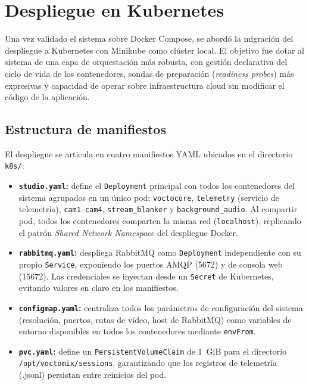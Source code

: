 \section{Despliegue en Kubernetes}
\label{sec:kubernetes}

Una vez validado el sistema sobre Docker Compose, se abordó la migración del despliegue
a Kubernetes con Minikube como clúster local. El objetivo fue dotar al sistema de una
capa de orquestación más robusta, con gestión declarativa del ciclo de vida de los
contenedores, sondas de preparación (\textit{readiness probes}) más expresivas y
capacidad de operar sobre infraestructura cloud sin modificar el código de la aplicación.

\subsection{Estructura de manifiestos}

El despliegue se articula en cuatro manifiestos YAML ubicados en el directorio
\texttt{k8s/}:

\begin{itemize}
  \item \textbf{\texttt{studio.yaml}:} define el \texttt{Deployment} principal con todos
        los contenedores del sistema agrupados en un único pod: \texttt{voctocore},
        \texttt{telemetry} (servicio de telemetría), \texttt{cam1}--\texttt{cam4},
        \texttt{stream\_blanker} y \texttt{background\_audio}. Al compartir pod, todos
        los contenedores comparten la misma red (\texttt{localhost}), replicando el
        patrón \textit{Shared Network Namespace} del despliegue Docker.
  \item \textbf{\texttt{rabbitmq.yaml}:} despliega RabbitMQ como \texttt{Deployment}
        independiente con su propio \texttt{Service}, exponiendo los puertos AMQP (5672)
        y de consola web (15672). Las credenciales se inyectan desde un
        \texttt{Secret} de Kubernetes, evitando valores en claro en los manifiestos.
  \item \textbf{\texttt{configmap.yaml}:} centraliza todos los parámetros de
        configuración del sistema (resolución, puertos, rutas de vídeo, host de
        RabbitMQ) como variables de entorno disponibles en todos los contenedores
        mediante \texttt{envFrom}.
  \item \textbf{\texttt{pvc.yaml}:} define un \texttt{PersistentVolumeClaim} de 1~GiB
        para el directorio \texttt{/opt/voctomix/sessions}, garantizando que los
        registros de telemetría (.jsonl) persistan entre reinicios del pod.
\end{itemize}

